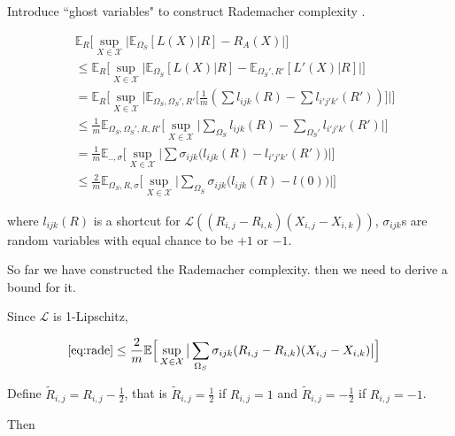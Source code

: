 \documentclass[conference]{IEEEtran}
\numberwithin{equation}{section}
\newcommand{\supX}{\sup_{X \in \mathcal{X}}}
\newcommand{\E}{\mathbb{E}}
\newtheorem{sampling strategy}{Sampling Strategy}
\begin{document}
Introduce ``ghost variables" to construct Rademacher complexity \cite{uml}.

\begin{subequations}
\begin{align}
    & \mathbb{E}_R \Big[ \sup_{X \in \mathcal{X}} \big|\mathbb{E}_{\Omega_S} [L(X) | R] - R_A(X) \big| \Big] \\
    & \leq \E_R  \Big[ \sup_{X \in \mathcal{X}} \big|\mathbb{E}_{\Omega_S} [L(X) | R] - \E_{\Omega_S', R'} [L'(X) | R] \big| \Big] \nonumber \\
    & = \E_R \Big[ \supX \big| \E_{\Omega_S, \Omega_S', R'} \big[ \frac{1}{m}( \sum l_{ijk}(R) - \sum l_{i'j'k'}(R') ) \big] \big| \Big] \nonumber \\
    & \leq \frac{1}{m} \E_{\Omega_S, \Omega_S', R, R'} \Big[ \supX \big| \sum_{ \Omega_S} l_{ijk}(R) - \sum_{ \Omega_S'} l_{i'j'k'}(R')  \big| \Big] \nonumber \\
    & = \frac{1}{m} \E_{.., \sigma} \Big[ \supX \big| \sum \sigma_{ijk} \big( l_{ijk}(R) - l_{i'j'k'}(R') \big) \big| \Big] \nonumber \\
    & \leq \frac{2}{m} \E_{\Omega_S, R, \sigma} \Big[ \supX \big| \sum_{\Omega_S} \sigma_{ijk} \big( l_{ijk}(R) - l(0) \big)  \big| \Big]  \label{eq:rade} 
\end{align}
\end{subequations}

where $l_{ijk}(R)$ is a shortcut for $\mathcal{L}((R_{i,j} - R_{i,k})(X_{i,j} - X_{i,k}))$, $\sigma_{ijk}$s are random variables with equal chance to be $+1$ or $-1$. 

So far we have constructed the Rademacher complexity. then we need to derive a bound for it.

Since $\mathcal{L}$ is 1-Lipschitz,

\begin{subequations}
\begin{align}
    \ref{eq:rade} & \leq \frac{2}{m} \E \Big[ \supX \big| \sum_{\Omega_S} \sigma_{ijk} (R_{i,j} - R_{i,k})(X_{i,j} - X_{i,k}) \big| \Big] \label{eq:lip}
\end{align}
\end{subequations}

Define $\tilde{R}_{i,j} = R_{i,j} - \frac{1}{2}$, that is $\tilde{R}_{i,j} = \frac{1}{2}$ if $R_{i,j} = 1$ and $\tilde{R}_{i,j} = -\frac{1}{2}$ if $R_{i,j} = -1$.

Then
\end{document}
